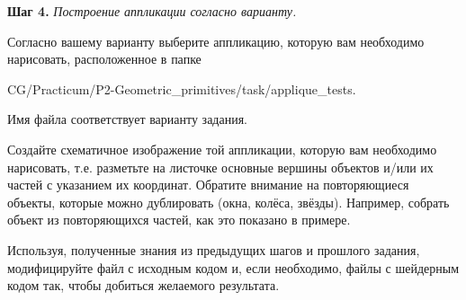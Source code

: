 \documentclass[a4paper,12pt]{article}
\begin{document}
    \textbf{Шаг 4.} \textit{Построение аппликации согласно варианту.}
    
    Согласно вашему варианту выберите аппликацию, которую вам необходимо нарисовать, расположенное в папке 
    
    \textquotedbl CG/Practicum/P2-Geometric\_primitives/task/applique\_tests\textquotedbl. 
    
    Имя файла соответствует варианту задания.
    
    Создайте схематичное изображение той аппликации, которую вам необходимо нарисовать, т.е. разметьте на листочке основные вершины объектов и/или их частей с указанием их координат. Обратите внимание на повторяющиеся объекты, которые можно дублировать (окна, колёса, звёзды). Например, собрать объект из повторяющихся частей, как это показано в примере.
    
    Используя, полученные знания из предыдущих шагов и прошлого задания, модифицируйте файл с исходным кодом и, если необходимо, файлы с шейдерным кодом так, чтобы добиться желаемого результата.
    
\end{document}
